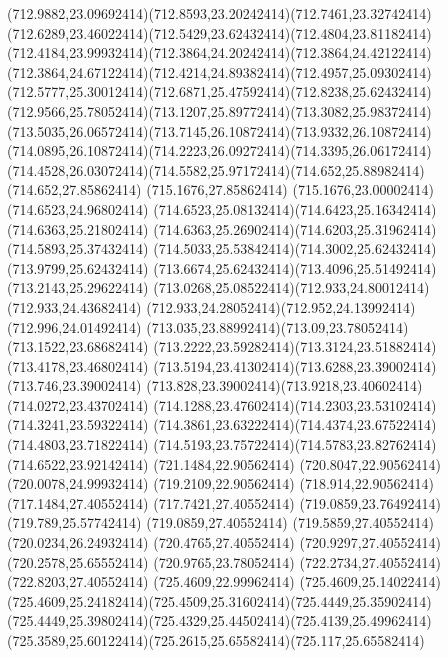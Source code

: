 {{	\curveto(712.9882,23.09692414)(712.8593,23.20242414)(712.7461,23.32742414)
	\curveto(712.6289,23.46022414)(712.5429,23.62432414)(712.4804,23.81182414)
	\curveto(712.4184,23.99932414)(712.3864,24.20242414)(712.3864,24.42122414)
	\curveto(712.3864,24.67122414)(712.4214,24.89382414)(712.4957,25.09302414)
	\curveto(712.5777,25.30012414)(712.6871,25.47592414)(712.8238,25.62432414)
	\curveto(712.9566,25.78052414)(713.1207,25.89772414)(713.3082,25.98372414)
	\curveto(713.5035,26.06572414)(713.7145,26.10872414)(713.9332,26.10872414)
	\curveto(714.0895,26.10872414)(714.2223,26.09272414)(714.3395,26.06172414)
	\curveto(714.4528,26.03072414)(714.5582,25.97172414)(714.652,25.88982414)
	\lineto(714.652,27.85862414)
	\lineto(715.1676,27.85862414)
	\lineto(715.1676,23.00002414)
	\closepath
	\moveto(714.6523,24.96802414)
	\curveto(714.6523,25.08132414)(714.6423,25.16342414)(714.6363,25.21802414)
	\curveto(714.6363,25.26902414)(714.6203,25.31962414)(714.5893,25.37432414)
	\curveto(714.5033,25.53842414)(714.3002,25.62432414)(713.9799,25.62432414)
	\curveto(713.6674,25.62432414)(713.4096,25.51492414)(713.2143,25.29622414)
	\curveto(713.0268,25.08522414)(712.933,24.80012414)(712.933,24.43682414)
	\curveto(712.933,24.28052414)(712.952,24.13992414)(712.996,24.01492414)
	\curveto(713.035,23.88992414)(713.09,23.78052414)(713.1522,23.68682414)
	\curveto(713.2222,23.59282414)(713.3124,23.51882414)(713.4178,23.46802414)
	\curveto(713.5194,23.41302414)(713.6288,23.39002414)(713.746,23.39002414)
	\curveto(713.828,23.39002414)(713.9218,23.40602414)(714.0272,23.43702414)
	\curveto(714.1288,23.47602414)(714.2303,23.53102414)(714.3241,23.59322414)
	\curveto(714.3861,23.63222414)(714.4374,23.67522414)(714.4803,23.71822414)
	\curveto(714.5193,23.75722414)(714.5783,23.82762414)(714.6522,23.92142414)
	\closepath
	\moveto(721.1484,22.90562414)
	\lineto(720.8047,22.90562414)
	\lineto(720.0078,24.99932414)
	\lineto(719.2109,22.90562414)
	\lineto(718.914,22.90562414)
	\lineto(717.1484,27.40552414)
	\lineto(717.7421,27.40552414)
	\lineto(719.0859,23.76492414)
	\lineto(719.789,25.57742414)
	\lineto(719.0859,27.40552414)
	\lineto(719.5859,27.40552414)
	\lineto(720.0234,26.24932414)
	\lineto(720.4765,27.40552414)
	\lineto(720.9297,27.40552414)
	\lineto(720.2578,25.65552414)
	\lineto(720.9765,23.78052414)
	\lineto(722.2734,27.40552414)
	\lineto(722.8203,27.40552414)
	\closepath
	\moveto(725.4609,22.99962414)
	\lineto(725.4609,25.14022414)
	\curveto(725.4609,25.24182414)(725.4509,25.31602414)(725.4449,25.35902414)
	\curveto(725.4449,25.39802414)(725.4329,25.44502414)(725.4139,25.49962414)
	\curveto(725.3589,25.60122414)(725.2615,25.65582414)(725.117,25.65582414)
}}
